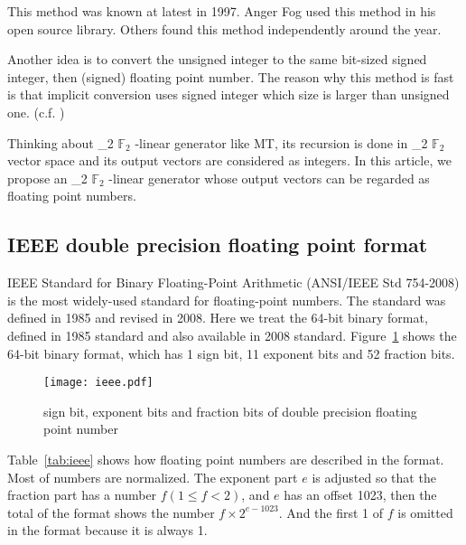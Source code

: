 \documentclass{svmult}
\def\bbf2{\ifmmode \mathbb{F}_2 \else $\mathbb{F}_2$ \fi}
\begin{document}
This method was known at latest in 1997. Anger Fog used this method in
his open source library\cite{web:Fog}.  Others found this method
independently around the year.

Another idea is to convert the unsigned integer to the same bit-sized
signed integer, then (signed) floating point number. The reason why
this method is fast is that implicit conversion uses signed integer
which size is larger than unsigned one. (c.f. \cite{doornik})

Thinking about \bbf2-linear generator like MT, its recursion is done
in \bbf2 vector space and its output vectors are considered as
integers.  In this article, we propose an \bbf2-linear generator whose
output vectors can be regarded as floating point numbers.

\subsection{IEEE double precision floating point format}
\label{sec:ieee}

IEEE Standard for Binary Floating-Point Arithmetic (ANSI/IEEE Std
754-2008)\cite{ieee754} is the most widely-used standard for
floating-point numbers. The standard was defined in 1985 and revised
in 2008. Here we treat the 64-bit binary format, defined in 1985
standard and also available in 2008 standard.  Figure~\ref{fig:ieee}
shows the 64-bit binary format, which has 1 sign bit, 11 exponent bits
and 52 fraction bits.

\begin{figure}
  \begin{center}
    \texttt{[image: ieee.pdf]}
    \caption{sign bit, exponent bits and fraction bits of double
      precision floating point number}
    \label{fig:ieee}
  \end{center}
\end{figure}

Table~\ref{tab:ieee} shows how floating point numbers are described in
the format. Most of numbers are normalized. The exponent part $e$ is
adjusted so that the fraction part has a number $f (1 \le f < 2)$, and
$e$ has an offset 1023, then the total of the format shows the number
$f \times 2^{e - 1023}$. And the first 1 of $f$ is omitted in the
format because it is always 1.
\end{document}
